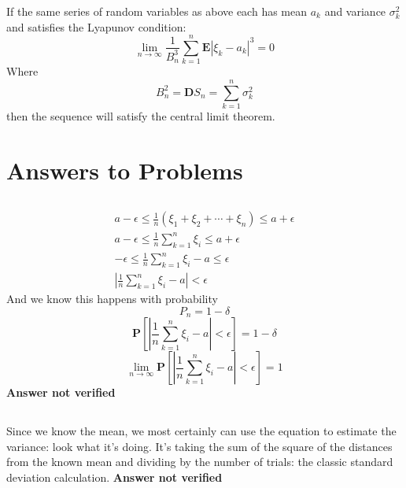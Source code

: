 If the same series of random variables as above each has mean $a_k$ and variance $\sigma^2_k$ and satisfies the Lyapunov condition:
\begin{equation}
	\lim_{n\rightarrow \infty} \frac{1}{B_n^3} \sum_{k=1}^n \textbf{E}|\xi_k - a_k|^3 = 0
\end{equation}
Where
\begin{equation}
	B_n^2 = \textbf{D}S_n = \sum_{k=1}^n \sigma^2_k
\end{equation}
then the sequence will satisfy the central limit theorem.


\section{Answers to Problems}
\subsection{}
\begin{eqnarray}
	a- \epsilon \leq \frac{1}{n}(\xi_1 +\xi_2 + \cdots + \xi_n) \leq a + \epsilon \\
	a- \epsilon \leq \frac{1}{n}\sum_{k=1}^n \xi_i \leq a + \epsilon \\
	- \epsilon \leq \frac{1}{n}\sum_{k=1}^n \xi_i -a \leq \epsilon \\
	\left| \frac{1}{n}\sum_{k=1}^n \xi_i -a  \right| < \epsilon
\end{eqnarray}
And we know this happens with probability
\begin{equation}
	P_n = 1- \delta
\end{equation}
\begin{equation}
	\textbf{P} \left[ \left| \frac{1}{n}\sum_{k=1}^n \xi_i -a  \right| < \epsilon  \right] = 1 - \delta
\end{equation}
\begin{equation}
	\lim_{n\rightarrow \infty} \textbf{P} \left[ \left| \frac{1}{n}\sum_{k=1}^n \xi_i -a  \right| < \epsilon  \right] = 1 
\end{equation}
\textbf{Answer not verified}

\subsection{}

Since we know the mean, we most certainly can use the equation to estimate the variance: look what it's doing.  It's taking the sum of the square of the distances from the known mean and dividing by the number of trials: the classic standard deviation calculation.
\textbf{Answer not verified}

